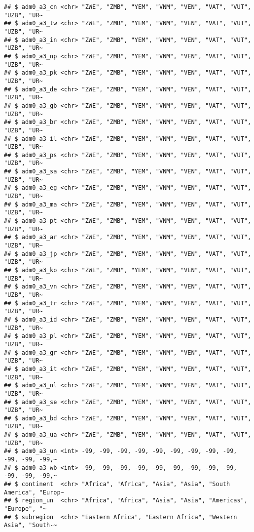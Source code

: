 \documentclass[
]{article}
\begin{document}
\begin{verbatim}
## $ adm0_a3_cn <chr> "ZWE", "ZMB", "YEM", "VNM", "VEN", "VAT", "VUT", "UZB", "UR~
## $ adm0_a3_tw <chr> "ZWE", "ZMB", "YEM", "VNM", "VEN", "VAT", "VUT", "UZB", "UR~
## $ adm0_a3_in <chr> "ZWE", "ZMB", "YEM", "VNM", "VEN", "VAT", "VUT", "UZB", "UR~
## $ adm0_a3_np <chr> "ZWE", "ZMB", "YEM", "VNM", "VEN", "VAT", "VUT", "UZB", "UR~
## $ adm0_a3_pk <chr> "ZWE", "ZMB", "YEM", "VNM", "VEN", "VAT", "VUT", "UZB", "UR~
## $ adm0_a3_de <chr> "ZWE", "ZMB", "YEM", "VNM", "VEN", "VAT", "VUT", "UZB", "UR~
## $ adm0_a3_gb <chr> "ZWE", "ZMB", "YEM", "VNM", "VEN", "VAT", "VUT", "UZB", "UR~
## $ adm0_a3_br <chr> "ZWE", "ZMB", "YEM", "VNM", "VEN", "VAT", "VUT", "UZB", "UR~
## $ adm0_a3_il <chr> "ZWE", "ZMB", "YEM", "VNM", "VEN", "VAT", "VUT", "UZB", "UR~
## $ adm0_a3_ps <chr> "ZWE", "ZMB", "YEM", "VNM", "VEN", "VAT", "VUT", "UZB", "UR~
## $ adm0_a3_sa <chr> "ZWE", "ZMB", "YEM", "VNM", "VEN", "VAT", "VUT", "UZB", "UR~
## $ adm0_a3_eg <chr> "ZWE", "ZMB", "YEM", "VNM", "VEN", "VAT", "VUT", "UZB", "UR~
## $ adm0_a3_ma <chr> "ZWE", "ZMB", "YEM", "VNM", "VEN", "VAT", "VUT", "UZB", "UR~
## $ adm0_a3_pt <chr> "ZWE", "ZMB", "YEM", "VNM", "VEN", "VAT", "VUT", "UZB", "UR~
## $ adm0_a3_ar <chr> "ZWE", "ZMB", "YEM", "VNM", "VEN", "VAT", "VUT", "UZB", "UR~
## $ adm0_a3_jp <chr> "ZWE", "ZMB", "YEM", "VNM", "VEN", "VAT", "VUT", "UZB", "UR~
## $ adm0_a3_ko <chr> "ZWE", "ZMB", "YEM", "VNM", "VEN", "VAT", "VUT", "UZB", "UR~
## $ adm0_a3_vn <chr> "ZWE", "ZMB", "YEM", "VNM", "VEN", "VAT", "VUT", "UZB", "UR~
## $ adm0_a3_tr <chr> "ZWE", "ZMB", "YEM", "VNM", "VEN", "VAT", "VUT", "UZB", "UR~
## $ adm0_a3_id <chr> "ZWE", "ZMB", "YEM", "VNM", "VEN", "VAT", "VUT", "UZB", "UR~
## $ adm0_a3_pl <chr> "ZWE", "ZMB", "YEM", "VNM", "VEN", "VAT", "VUT", "UZB", "UR~
## $ adm0_a3_gr <chr> "ZWE", "ZMB", "YEM", "VNM", "VEN", "VAT", "VUT", "UZB", "UR~
## $ adm0_a3_it <chr> "ZWE", "ZMB", "YEM", "VNM", "VEN", "VAT", "VUT", "UZB", "UR~
## $ adm0_a3_nl <chr> "ZWE", "ZMB", "YEM", "VNM", "VEN", "VAT", "VUT", "UZB", "UR~
## $ adm0_a3_se <chr> "ZWE", "ZMB", "YEM", "VNM", "VEN", "VAT", "VUT", "UZB", "UR~
## $ adm0_a3_bd <chr> "ZWE", "ZMB", "YEM", "VNM", "VEN", "VAT", "VUT", "UZB", "UR~
## $ adm0_a3_ua <chr> "ZWE", "ZMB", "YEM", "VNM", "VEN", "VAT", "VUT", "UZB", "UR~
## $ adm0_a3_un <int> -99, -99, -99, -99, -99, -99, -99, -99, -99, -99, -99, -99,~
## $ adm0_a3_wb <int> -99, -99, -99, -99, -99, -99, -99, -99, -99, -99, -99, -99,~
## $ continent  <chr> "Africa", "Africa", "Asia", "Asia", "South America", "Europ~
## $ region_un  <chr> "Africa", "Africa", "Asia", "Asia", "Americas", "Europe", "~
## $ subregion  <chr> "Eastern Africa", "Eastern Africa", "Western Asia", "South-~

\end{verbatim}
\end{document}
